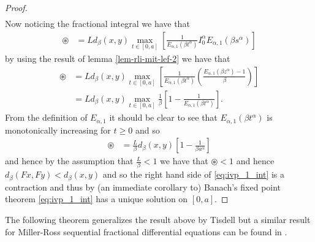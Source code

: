 \begin{proof}
\begin{align}
	\end{align}
	Now noticing the fractional integral we have that
	\begin{align}
		\circledast &= L d_\beta(x,y) \max_{t\in [0,a]} \left[ \frac{1}{E_{\alpha,1}(\beta t^\alpha)} I^\alpha_0 E_{\alpha,1}(\beta s^\alpha) \right]
	\end{align}
	by using the result of lemma \ref{lem-rli-mit-lef-2} we have that
	\begin{align}
		\circledast &= L d_\beta(x,y) \max_{t\in [0,a]} \left[ \frac{1}{E_{\alpha,1}(\beta t^\alpha)} \left( \frac{E_{\alpha,1}(\beta z^\alpha) - 1}{\beta} \right) \right] \\
			&= L d_\beta(x,y) \max_{t\in [0,a]} \frac{1}{\beta}\left[ 1 - \frac{1}{E_{\alpha, 1}(\beta t^\alpha)} \right].
	\end{align}
	From the definition of $ E_{\alpha,1} $ it should be clear to see that $ E_{\alpha, 1}(\beta t^\alpha) $ is monotonically increasing for $ t \geq 0 $ and so
	\begin{align}
		\circledast &= \frac{L}{\beta} d_\beta (x,y)\left[ 1- \frac{1}{\beta a^\alpha} \right]
	\end{align}
	and hence by the assumption that $ \frac{L}{\beta} < 1 $ we have that $ \circledast < 1 $ and hence $ d_\beta(Fx, Fy) < d_\beta(x,y) $ and so the right hand side of \eqref{eq:ivp_1_int} is a contraction and thus by (an immediate corollary to) Banach's fixed point theorem \eqref{eq:ivp_1_int} has a unique solution on $ [0,a] $.
\end{proof}



The following theorem generalizes the result above by Tisdell \cite{Tisdell2012} but a similar result for Miller-Ross sequential
fractional differential equations can be found in \cite{Podlubny1999}.


